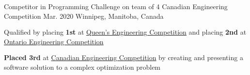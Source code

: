
\begin{cventries}

  \cventry
    {Competitor in Programming Challenge on team of 4} %
    {Canadian Engineering Competition} %
    {Mar. 2020} %
    {Winnipeg, Manitoba, Canada} %
    {
      \begin{cvitems} %
        \item{Qualified by placing \textbf{1st} at \href{https://quengcomp.ca/}{Queen's Engineering Competition} and placing \textbf{2nd} at \href{https://www.oec2020.ca/}{Ontario Engineering Competition}}
        \item{\textbf{Placed 3rd} at \href{https://cfes.ca/cec/}{Canadian Engineering Competition} by creating and presenting a software solution to a complex optimization problem}
      \end{cvitems}
    }



\end{cventries}
